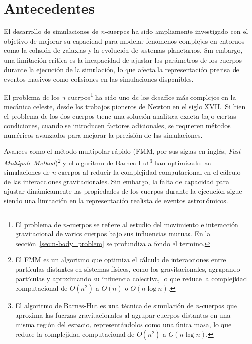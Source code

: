\section{Antecedentes}
El desarrollo de simulaciones de \textit{n}-cuerpos ha sido ampliamente investigado con el objetivo de mejorar su capacidad para modelar fenómenos complejos en entornos como la colisión de galaxias y la evolución de sistemas planetarios. Sin embargo, una limitación crítica es la incapacidad de ajustar los parámetros de los cuerpos durante la ejecución de la simulación, lo que afecta la representación precisa de eventos masivos como colisiones en las simulaciones disponibles.

El problema de los \textit{n}-cuerpos\footnote{El problema de \textit{n}-cuerpos se refiere al estudio del movimiento e interacción gravitacional de varios cuerpos bajo sus influencias mutuas. En la sección~\ref{sec:n-body_problem} se profundiza a fondo el termino.} ha sido uno de los desafíos más complejos en la mecánica celeste, desde los trabajos pioneros de Newton en el siglo XVII.\ Si bien el problema de los dos cuerpos tiene una solución analítica exacta bajo ciertas condiciones, cuando se introducen factores adicionales, se requieren métodos numéricos avanzados para mejorar la precisión de las simulaciones.

Avances como el método multipolar rápido (FMM, por sus siglas en inglés, \textit{Fast Multipole Method})\footnote{El FMM es un algoritmo que optimiza el cálculo de interacciones entre partículas distantes en sistemas físicos, como los gravitacionales, agrupando partículas y aproximando su influencia colectiva, lo que reduce la complejidad computacional de \(O(n^2)\) a \(O(n)\) o \(O(n \log n)\).} y el algoritmo de Barnes-Hut\footnote{El algoritmo de Barnes-Hut es una técnica de simulación de \textit{n}-cuerpos que aproxima las fuerzas gravitacionales al agrupar cuerpos distantes en una misma región del espacio, representándolos como una única masa, lo que reduce la complejidad computacional de \(O(n^2)\) a \(O(n \log n)\).} han optimizado las simulaciones de \textit{n}-cuerpos al reducir la complejidad computacional en el cálculo de las interacciones gravitacionales. Sin embargo, la falta de capacidad para ajustar dinámicamente las propiedades de los cuerpos durante la ejecución sigue siendo una limitación en la representación realista de eventos astronómicos.

